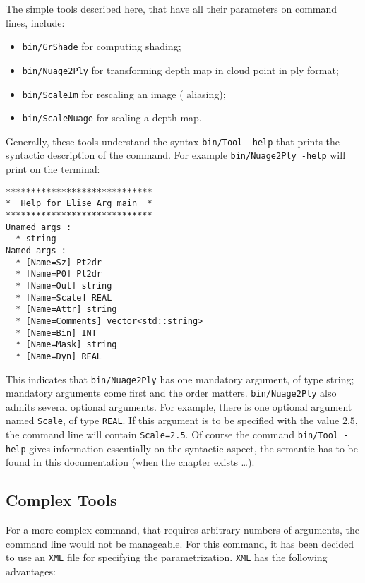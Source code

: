 The simple tools described here, that have all their parameters on command lines,
include:

\begin{itemize}
    \item {\tt bin/GrShade} for computing shading;
    \item {\tt bin/Nuage2Ply} for transforming depth map in cloud point in ply format;
    \item {\tt bin/ScaleIm} for rescaling an image ( aliasing); %
    \item {\tt bin/ScaleNuage} for scaling a depth map.
\end{itemize}

Generally, these tools understand the syntax {\tt bin/Tool -help} that prints the syntactic
description of the command. For example{ \tt bin/Nuage2Ply -help} will print on the terminal:

\begin{verbatim}
*****************************
*  Help for Elise Arg main  *
*****************************
Unamed args : 
  * string
Named args : 
  * [Name=Sz] Pt2dr
  * [Name=P0] Pt2dr
  * [Name=Out] string
  * [Name=Scale] REAL
  * [Name=Attr] string
  * [Name=Comments] vector<std::string>
  * [Name=Bin] INT
  * [Name=Mask] string
  * [Name=Dyn] REAL
\end{verbatim}


This indicates that {\tt bin/Nuage2Ply} has one mandatory argument, of type string;
mandatory arguments come first and the order matters. { \tt bin/Nuage2Ply}  also admits 
several optional arguments. For example, there is one optional argument named  { \tt Scale},
of type  { \tt REAL}. If this argument is to be specified with the value $2.5$,  the command
line will contain {\tt Scale=2.5}.  Of course the command  {\tt bin/Tool -help} gives information
essentially on the syntactic aspect, the semantic has to be found in this documentation
(when the chapter exists \dots).

\subsection{Complex Tools}

For a more complex command, that requires arbitrary numbers of arguments, the command line
would not be manageable. For this command, it has been decided to use an {\tt XML} file
for specifying the parametrization. {\tt XML} has the following advantages:


